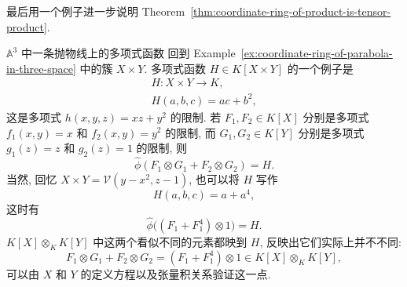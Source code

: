最后用一个例子进一步说明 Theorem~\ref{thm:coordinate-ring-of-product-is-tensor-product}.

\begin{Example}{$\mathbb{A}^{3}$ 中一条抛物线上的多项式函数}\leavevmode\label{ex:polynomial-functions-on-parabola-in-three-space}
回到 Example~\ref{ex:coordinate-ring-of-parabola-in-three-space} 中的簇 $X\times Y$. 多项式函数 $H\in K[X\times Y]$ 的一个例子是
\[
  \begin{gathered}
    H:X\times Y\to K,\\
    H(a,b,c)=ac+b^{2},
  \end{gathered}
\]
这是多项式 $h(x,y,z)=xz+y^{2}$ 的限制. 若 $F_{1},F_{2}\in K[X]$ 分别是多项式 $f_{1}(x,y)=x$ 和 $f_{2}(x,y)=y^{2}$ 的限制, 而 $G_{1},G_{2}\in K[Y]$ 分别是多项式 $g_{1}(z)=z$ 和 $g_{2}(z)=1$ 的限制, 则
\[
  \widehat{\phi}(F_{1}\otimes G_{1}+F_{2}\otimes G_{2})=H.
\]
当然, 回忆 $X\times Y=\mathcal{V}(y-x^{2},z-1)$, 也可以将 $H$ 写作
\[
  H(a,b,c)=a+a^{4},
\]
这时有
\[
  \widehat{\phi}\bigl((F_{1}+F_{1}^{4})\otimes1\bigr)=H.
\]
$K[X]\otimes_{K}K[Y]$ 中这两个看似不同的元素都映到 $H$, 反映出它们实际上并不不同:
\[
  F_{1}\otimes G_{1}+F_{2}\otimes G_{2}=(F_{1}+F_{1}^{4})\otimes1
    \in K[X]\otimes_{K}K[Y],
\]
可以由 $X$ 和 $Y$ 的定义方程以及张量积关系验证这一点.
\end{Example}

